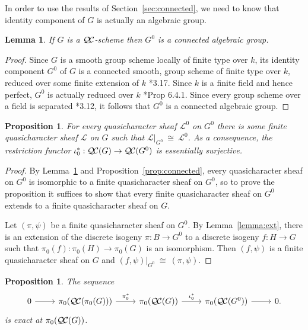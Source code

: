 \documentclass{amsart}
\theoremstyle{plain}
\newtheorem{proposition}[theorem]{Proposition}
\newtheorem{lemma}[theorem]{Lemma}
\theoremstyle{definition}
\theoremstyle{remark}
\newcommand{\Fq}{k}
\newcommand{\iso}{{\ \cong\ }}
\newcommand{\qcs}[1]{{\mathcal{#1}}}
\newcommand{\QC}{{\mathcal{Q\hskip-0.8pt C}}}
\newcommand{\QCiso}[1]{\pi_0 (\QC(#1))}
\begin{document}
In order to use the results of Section~\ref{sec:connected}, we need to know that
identity component of $G$ is actually an algebraic group.

\begin{lemma} \label{lem:G0alg-grp}
If $G$ is a $\QC$-scheme then $G^0$ is a connected algebraic group.
\end{lemma}
\begin{proof}
 Since $G$ is a smooth group scheme locally of finite type over $\Fq$, its
 identity component $G^0$ of $G$ is a connected smooth, 
 group scheme of finite type over $\Fq$, reduced over some finite extension of $\Fq$
 \cite{vdGeer-Moonen:AbelianVarieties}*{3.17}. 
 Since $\Fq$ is a finite field and hence perfect, $G^0$ is actually reduced over $\Fq$
 \cite{EGAIV2}*{Prop 6.4.1}.  Since every group scheme over a field is separated 
 \cite{vdGeer-Moonen:AbelianVarieties}*{3.12},
 it follows that $G^0$ is a connected algebraic group.
\end{proof}

\begin{proposition}\label{prop:restriction}
For every quasicharacter sheaf $\qcs{L}^0$ on $G^0$ there is some finite quasicharacter sheaf
$\qcs{L}$ on $G$ such that $\qcs{L}\vert_{G^0} \iso \qcs{L}^0$.
As a consequence, the restriction functor $\iota_0^* : \QC(G)\to \QC(G^0)$ is essentially surjective.
\end{proposition}

\begin{proof}
  By Lemma~\ref{lem:G0alg-grp} and Proposition~\ref{prop:connected}, every
  quasicharacter sheaf on $G^0$ is isomorphic to a 
  finite quasicharacter sheaf on $G^0$, 
  so to prove the proposition it suffices to show that every 
  finite quasicharacter sheaf on $G^0$ extends to a finite quasicharacter sheaf on $G$.
  
 Let $(\pi,\psi)$ be a finite quasicharacter sheaf on $G^0$.
 By Lemma~\ref{lemma:ext}, there is an extension of the 
 discrete isogeny $\pi : B \to G^0$ to a discrete isogeny $f : H \to G$ 
 such that $\pi_0(f) : \pi_0(H)\to \pi_0(G)$ is an isomorphism.
 Then $(f,\psi)$ is a finite quasicharacter sheaf on $G$ and 
 $(f,\psi)\vert_{G^0} \iso (\pi,\psi)$.
\end{proof}

\begin{proposition}\label{prop:middleexact}
 The sequence 
 \[
  \begin{tikzcd}
  0 \rar & \QCiso{\pi_0(G)} \arrow{r}{\pi_0^*} & \QCiso{G} \arrow{r}{\iota_0^*} & \QCiso{G^0} \rar & 0.
  \end{tikzcd}
 \]
 is exact at $\QCiso{G}$.
\end{proposition}
\end{document}
